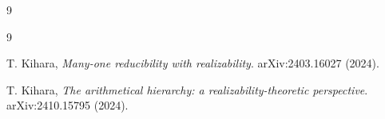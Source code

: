\documentclass[11pt]{amsart}
\theoremstyle{definition}
\newtheorem{problem}{Problem}[section]
\begin{document}
{%
%









\vskip -10pt
\begin{bibentry}{9}
\begin{thebibliography}{9}

T. Kihara,
\textit{Many-one reducibility with realizability}.
arXiv:2403.16027 (2024).

T. Kihara,
\textit{The arithmetical hierarchy:
a realizability-theoretic perspective}.
arXiv:2410.15795 (2024).

\end{thebibliography}
\end{bibentry}
}
\end{document}
